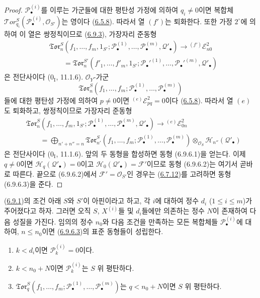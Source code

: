 \begin{proof}
$\mathscr P_\bullet^{(i)}$를 이루는 가군들에 대한 평탄성 가정에
의하여 $q_i\ne0$이면 복합체
$\mathscr{T}\!or_{q_i}^S
(\mathscr P_\bullet^{(i)},\mathscr O_{S'})$는 영이다
(\hyperref[III.6.5.8-fr]{6.5.8}). 따라서 열 $(f')$는 퇴화한다.
또한 가정 $2^\circ$에 의하여 이 열은 쌍정칙이므로
(\hyperref[III.6.9.3-fr]{6.9.3}), 가장자리 준동형
\[
\begin{split}
  &\mathfrak{Tor}_n^S
  (f_1,\ldots,f_m,1_{S'};
   \mathscr P_\bullet^{(1)},\ldots,
   \mathscr P_\bullet^{(m)},\mathscr Q'_\bullet)
  \longrightarrow {}^{(f')}\mathscr E_{n0}^2\\
  &\qquad=
  \mathfrak{Tor}_n^{S'}
  (f'_1,\ldots,f'_m,1_{S'};
   \mathscr P_\bullet'^{(1)},\ldots,
   \mathscr P_\bullet'^{(m)},\mathscr Q'_\bullet)
\end{split}
\tag{6.9.6.4}\label{III.6.9.6.4.fr}
\]
은 전단사이다 ($0_{\mathrm I}$, 11.1.6).
$\mathscr O_Y$-가군
\[
  \mathfrak{Tor}_n^S
  (f_1,\ldots,f_m;
   \mathscr P_\bullet^{(1)},\ldots,\mathscr P_\bullet^{(m)})
\]
들에 대한 평탄성 가정에 의하여 $p\ne0$이면
${}^{(e)}\mathscr E_{pq}^2=0$이다
(\hyperref[III.6.5.8-fr]{6.5.8}). 따라서 열 $(e)$도 퇴화하고,
쌍정칙이므로 가장자리 준동형
\[
\begin{split}
  &\mathfrak{Tor}_n^S
  (f_1,\ldots,f_m,1_{S'};
   \mathscr P_\bullet^{(1)},\ldots,
   \mathscr P_\bullet^{(m)},\mathscr Q'_\bullet)
  \longrightarrow {}^{(e)}\mathscr E_{0n}^2\\
  &\qquad=
  \bigoplus_{n'+n''=n}
  \mathfrak{Tor}_{n'}^S
  (f_1,\ldots,f_m;
   \mathscr P_\bullet^{(1)},\ldots,
   \mathscr P_\bullet^{(m)})
  \otimes_{\mathscr O_S}\mathscr H_{n''}(\mathscr Q'_\bullet)
\end{split}
\tag{6.9.6.5}\label{III.6.9.6.5.fr}
\]
은 전단사이다 ($0_{\mathrm I}$, 11.1.6). 앞의 두 동형을 합성하면
동형 (6.9.6.1)을 얻는다. 이제
$q\ne0$이면 $\mathscr H_q(\mathscr Q'_\bullet)=0$이고
$\mathscr H_0(\mathscr Q'_\bullet)=\mathscr F'$이므로 동형
(6.9.6.2)는 여기서 곧바로 따른다. 끝으로 (6.9.6.2)에서
$\mathscr F'=\mathscr O_{S'}$인 경우는
(\hyperref[III.6.7.12-fr]{6.7.12})를 고려하면 동형 (6.9.6.3)을
준다.
\end{proof}

\begin{corollary}[6.9.7]
\label{III.6.9.7-fr}
(\hyperref[subsection:III.6.9.fr]{6.9.1})의 조건 아래 $S$와 $S'$이
아핀이라고 하고, 각 $i$에 대하여 정수 $d_i$ ($1\leq i\leq m$)가
주어졌다고 하자. 그러면 오직 $S$, $X^{(i)}$들 및 $d_i$들에만 의존하는
정수 $N$이 존재하여 다음 성질을 가진다. 임의의 정수 $n_0$와 다음
조건을 만족하는 모든 복합체들 $\mathscr P_\bullet^{(i)}$에 대하여,
$n\leq n_0$이면 (\hyperref[III.6.9.6.3.fr]{6.9.6.3})의 표준 동형들이
성립한다.
\begin{enumerate}
  \item[$1^\circ$] $k<d_i$이면 $\mathscr P_k^{(i)}=0$이다.
  \item[$2^\circ$] $k<n_0+N$이면 $\mathscr P_k^{(i)}$는 $S$ 위
  평탄하다.
  \item[$3^\circ$]
  $\mathfrak{Tor}_q^S(f_1,\ldots,f_m;
  \mathscr P_\bullet^{(1)},\ldots,\mathscr P_\bullet^{(m)})$는
  $q<n_0+N$이면 $S$ 위 평탄하다.
\end{enumerate}
\end{corollary}

